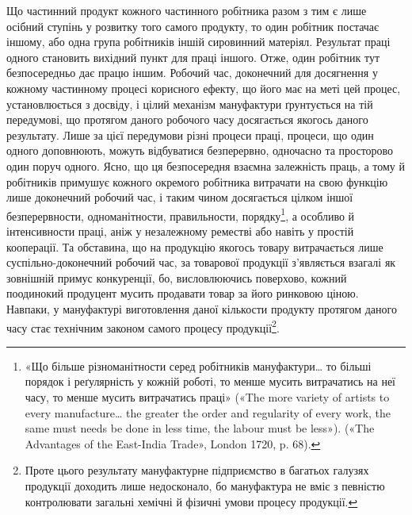 Що частинний продукт кожного частинного робітника разом
з тим є лише осібний ступінь у розвитку того самого продукту,
то один робітник постачає іншому, або одна група робітників
іншій сировинний матеріял. Результат праці одного становить
вихідний пункт для праці іншого. Отже, один робітник тут безпосередньо
дає працю іншим. Робочий час, доконечний для
досягнення у кожному частинному процесі корисного ефекту,
що його має на меті цей процес, установлюється з досвіду, і цілий
механізм мануфактури ґрунтується на тій передумові, що протягом
даного робочого часу досягається якогось даного результату.
Лише за цієї передумови різні процеси праці, процеси, що
один одного доповнюють, можуть відбуватися безперервно,
одночасно та просторово один поруч одного. Ясно, що ця безпосередня
взаємна залежність праць, а тому й робітників примушує
кожного окремого робітника витрачати на свою функцію лише
доконечний робочий час, і таким чином досягається цілком іншої
безперервности, одноманітности, правильности, порядку\footnote{
«Що більше різноманітности серед робітників мануфактури\dots{} то
більші порядок і реґулярність у кожній роботі, то менше мусить витрачатись
на неї часу, то менше мусить витрачатись праці» («The more variety
of artists to every manufacture\dots{} the greater the order and regularity of
every work, the same must needs be done in less time, the labour must
be less»). («The Advantages of the East-India Trade», London 1720, p. 68).
}, а особливо
й інтенсивности праці, аніж у незалежному реместві або
навіть у простій кооперації. Та обставина, що на продукцію
якогось товару витрачається лише суспільно-доконечний робочий
час, за товарової продукції з’являється взагалі як зовнішній
примус конкуренції, бо, висловлюючись поверхово, кожний
поодинокий продуцент мусить продавати товар за його ринковою
ціною. Навпаки, у мануфактурі виготовлення даної кількости
продукту протягом даного часу стає технічним законом самого
процесу продукції\footnote{
Проте цього результату мануфактурне підприємство в багатьох
галузях продукції доходить лише недосконало, бо мануфактура не вміє
з певністю контролювати загальні хемічні й фізичні умови процесу продукції.
}.


